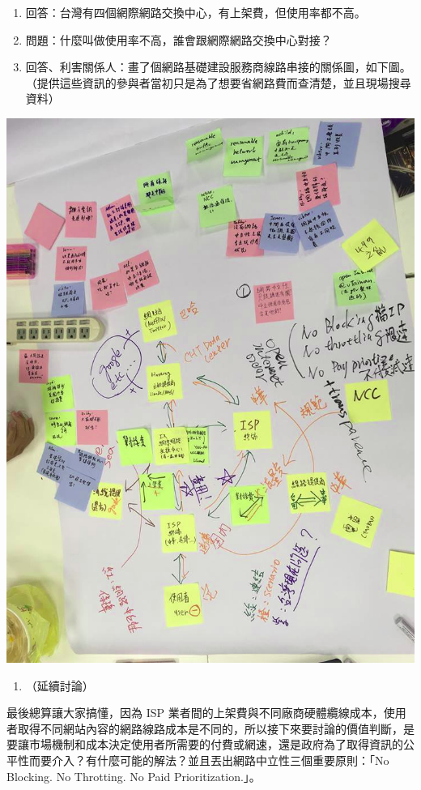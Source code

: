 \documentclass[12pt,a4paper]{article}
\begin{document}
\begin{enumerate}
\begin{enumerate}
\begin{enumerate}
\item 回答：台灣有四個網際網路交換中心，有上架費，但使用率都不高。
\item 問題：什麼叫做使用率不高，誰會跟網際網路交換中心對接？
\item 回答、利害關係人：畫了個網路基礎建設服務商線路串接的關係圖，如下圖。（提供這些資訊的參與者當初只是為了想要省網路費而查清楚，並且現場搜尋資料）
\end{enumerate}
\begin{center}
\includegraphics[width=.9\linewidth]{./images/net-neutrality-ISP.png}
\end{center}
\begin{enumerate}
\item （延續討論）
\end{enumerate}
最後總算讓大家搞懂，因為 ISP 業者間的上架費與不同廠商硬體纜線成本，使用者取得不同網站內容的網路線路成本是不同的，所以接下來要討論的價值判斷，是要讓市場機制和成本決定使用者所需要的付費或網速，還是政府為了取得資訊的公平性而要介入？有什麼可能的解法？並且丟出網路中立性三個重要原則：「No Blocking. No Throtting. No Paid Prioritization.」。
\begin{center}

\end{center}
\end{enumerate}
\end{enumerate}
\end{document}
